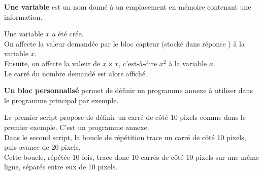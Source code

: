 \bigskip

{\bf Une variable} est un nom donné à un emplacement en mémoire contenant une information. \\ [-8mm]  
\begin{exemple}   
   {\vspace*{1mm}
   \begin{scratch}    
   \end{scratch}
   }
   \correction
      Une variable $x$ a été crée. \\
      On affecte la valeur demandée par le bloc capteur (stocké dans \og réponse \fg) à la variable $x$. \\
      Ensuite, on affecte la valeur de $x\times x$, c'est-à-dire $x^2$ à la variable $x$. \\
      Le carré du nombre demandé est alors affiché.
\end{exemple}

\bigskip

{\bf Un bloc personnalisé} permet de définir un programme annexe à utiliser dans le programme principal par exemple. \\ [-8mm]
\begin{exemple}[0.5]   
   {
   \begin{scratch}
         {
         }
     \end{scratch}
     \quad
     \begin{scratch}
           {
           }
      \end{scratch}
      }
   \correction
      Le premier script propose de définir un carré de côté 10 pixels comme dans le premier exemple. C'est un programme annexe. \\
      Dans le second script, la boucle de répétition trace un carré de côté 10 pixels, puis avance de 20 pixels. \\
      Cette boucle, répétée 10 fois, trace donc 10 carrés de côté 10 pixels sur une même ligne, séparés entre eux de 10 pixels.
\end{exemple}


